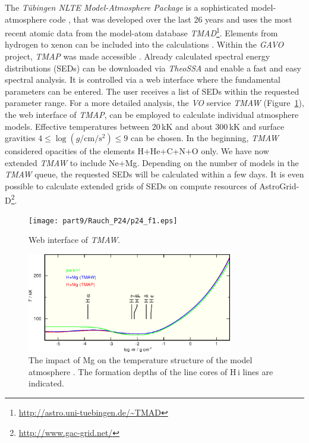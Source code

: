 The \emph{T\"ubingen NLTE Model-Atmosphere Package} \citep[\emph{TMAP},][]{werneretal2003, rauchdeetjen2003} is a sophisticated model-atmosphere code \citep[e.g\@.][]{rauchetal2007}, that was developed over the last 26 years and uses the most recent atomic data from the model-atom database \emph{TMAD}\footnote[1]{\url{http://astro.uni-tuebingen.de/~TMAD}}. Elements from hydrogen to xenon can be included into the calculations \citep{rauch2003,werneretal2012,rauchetal2012}. Within the \emph{GAVO} project, \emph{TMAP} was made accessible \citep{rauchringat2011}. Already calculated spectral energy distributions (SEDs) can be downloaded via \emph{TheoSSA} and enable a fast and easy spectral analysis. It is controlled via a web interface where the fundamental parameters can be entered. The user receives a list of SEDs within the requested parameter range. For a more detailed analysis, the \emph{VO} service \emph{TMAW} (Figure~\ref{fig:tmaw}), the web interface of \emph{TMAP}, can be employed to calculate individual atmosphere models. Effective temperatures between 20\,kK and about 300\,kK and surface gravities $4 \leq \log (g / \mathrm{cm/s^2}) \leq 9$ can be chosen. In the beginning,  \emph{TMAW} considered opacities of the elements H+He+C+N+O only. We have now extended \emph{TMAW} to include Ne+Mg. Depending on the number of models in the \emph{TMAW} queue, the requested SEDs will be calculated within a few days. It is even possible to calculate extended grids of SEDs on compute resources of AstroGrid-D\footnote[2]{\url{http://www.gac-grid.net/}}.


\begin{landscape}
\begin{figure}[ht!]\centering
\texttt{[image: part9/Rauch\_P24/p24\_f1.eps]}
\caption{Web interface of \emph{TMAW}.}
\label{fig:tmaw}
\end{figure}
\end{landscape}


\begin{figure}[ht!]\centering
\includegraphics[width=0.8\textwidth]{part9/Rauch_P24/p24_f2.eps}
\caption{The impact of Mg on the temperature structure of the model atmosphere
         \citep[$T_\mathrm{eff}=60\,\mathrm{kK}$, $\log g = 7$, solar abundances,][]{asplundetal2009}.
         The formation depths of the line cores of H\,{\sc i} lines are indicated.}
\label{fig:Tstruc}
\end{figure}


